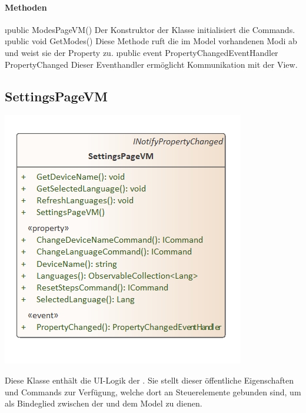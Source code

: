 \documentclass[../entwurf.tex]{subfiles}
\begin{document}
\paragraph{Methoden}
\begin{itemize}
	\i{public ModesPageVM()} Der Konstruktor der Klasse initialisiert die Commands.
	\i{public void GetModes()} Diese Methode ruft die im Model vorhandenen Modi ab und weist sie der Property  zu.
	\i{public event PropertyChangedEventHandler PropertyChanged} Dieser Eventhandler ermöglicht Kommunikation mit der View.
\end{itemize}
\subsection{SettingsPageVM}
\begin{minipage}{0.5\textwidth}
\includegraphics[scale=0.75]{../graphics/vm_klassen/SettingsPageVM.png}
\end{minipage}
\begin{minipage}{0.5\textwidth}
Diese Klasse enthält die UI-Logik der . Sie stellt dieser öffentliche Eigenschaften und Commands zur Verfügung, welche dort an Steuerelemente gebunden sind, um als Bindeglied zwischen der  und dem Model zu dienen.
\end{minipage}
\end{document}
